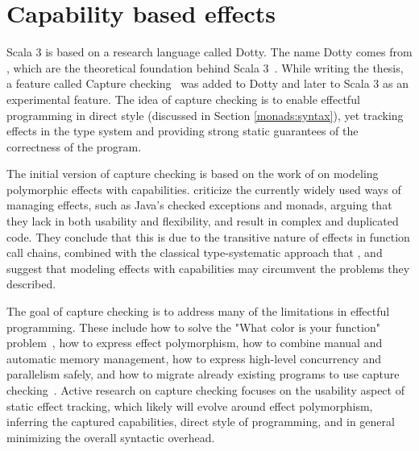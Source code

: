 


\section{Capability based effects}\label{capability-effs}
Scala 3 is based on a research language called Dotty. The name Dotty comes from , which are the theoretical foundation behind Scala 3~\cite{essence-of-dot}. While writing the thesis, a feature called Capture checking~\cite{capture-checking} was added to Dotty and later to Scala 3 as an experimental feature. The idea of capture checking is to enable effectful programming in direct style (discussed in Section \ref{monads:syntax}), yet tracking effects in the type system and providing strong static guarantees of the correctness of the program.

The initial version of capture checking is based on the work of \textcite{scoped-capabilities} on modeling polymorphic effects with capabilities. \citeauthor{scoped-capabilities} criticize the currently widely used ways of managing effects, such as Java's checked exceptions and monads, arguing that they lack in both usability and flexibility, and result in complex and duplicated code. They conclude that this is due to the transitive nature of effects in function call chains, combined with the classical type-systematic approach that , and suggest that modeling effects with capabilities may circumvent the problems they described.

The goal of capture checking is to address many of the limitations in effectful programming. These include how to solve the "What color is your function" problem~\cite{what-color-is-your-function}, how to express effect polymorphism, how to combine manual and automatic memory management, how to express high-level concurrency and parallelism safely, and how to migrate already existing programs to use capture checking~\cite{odersky-twitter-caprese}. Active research on capture checking focuses on the usability aspect of static effect tracking, which likely will evolve around effect polymorphism, inferring the captured capabilities, direct style of programming, and in general minimizing the overall syntactic overhead.

